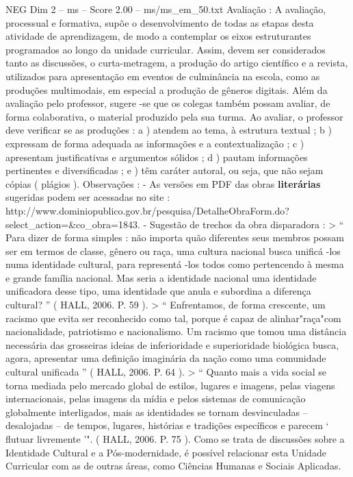 \begin{textsample}{NEG Dim 2 – ms – Score 2.00 – ms/ms\_em\_50.txt}  \label{ex:f2_neg_250}
Avaliação : A avaliação, processual e formativa, supõe o desenvolvimento de todas as etapas desta atividade de aprendizagem, de modo a contemplar os eixos estruturantes programados ao longo da unidade curricular.
Assim, devem ser considerados tanto as discussões, o curta-metragem, a produção do artigo científico e a revista, utilizados para apresentação em eventos de culminância na escola, como as produções multimodais, em especial a produção de gêneros digitais.
Além da avaliação pelo professor, sugere -se que os colegas também possam avaliar, de forma colaborativa, o material produzido pela sua turma.
Ao avaliar, o professor deve verificar se as produções : a ) atendem ao tema, à estrutura textual ; b ) expressam de forma adequada as informações e a contextualização ; c ) apresentam justificativas e argumentos sólidos ; d ) pautam informações pertinentes e diversificadas ; e ) têm caráter autoral, ou seja, que não sejam cópias ( plágios ).
Observações : - As versões em PDF das obras \textbf{literárias} sugeridas podem ser acessadas no site : http://www.dominiopublico.gov.br/pesquisa/DetalheObraForm.do? select\_action=\&co\_obra=1843. - Sugestão de trechos da obra disparadora : > “ Para dizer de forma simples : não importa quão diferentes seus membros possam ser em termos de classe, gênero ou raça, uma cultura nacional busca unificá -los numa identidade cultural, para representá -los todos como pertencendo à mesma e grande família nacional.
Mas seria a identidade nacional uma identidade unificadora desse tipo, uma identidade que anula e subordina a diferença cultural? ” ( HALL, 2006.
P. 59 ). > “ Enfrentamos, de forma crescente, um racismo que evita ser reconhecido como tal, porque é capaz de alinhar"raça"com nacionalidade, patriotismo e nacionalismo.
Um racismo que tomou uma distância necessária das grosseiras ideias de inferioridade e superioridade biológica busca, agora, apresentar uma definição imaginária da nação como uma comunidade cultural unificada ” ( HALL, 2006.
P. 64 ). > “ Quanto mais a vida social se torna mediada pelo mercado global de estilos, lugares e imagens, pelas viagens internacionais, pelas imagens da mídia e pelos sistemas de comunicação globalmente interligados, mais as identidades se tornam desvinculadas – desalojadas – de tempos, lugares, histórias e tradições específicos e parecem ‘ flutuar livremente ’". ( HALL, 2006.
P. 75 ).
Como se trata de discussões sobre a Identidade Cultural e a Pós-modernidade, é possível relacionar esta Unidade Curricular com as de outras áreas, como Ciências Humanas e Sociais Aplicadas.

\end{textsample}
